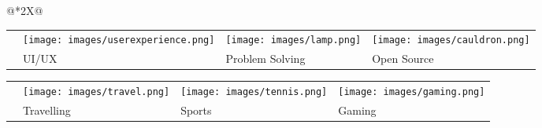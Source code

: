 \documentclass{resume}
\begin{document}
\begin{center}
\begin{tabularx}{\linewidth}{@{}*{2}{X}@{}}
{{        \vspace{0.32cm}
        \begin{tabularx}{\linewidth}{@{}*{4}{>{\centering\arraybackslash}X}@{}}
            {\centering
            \texttt{[image: images/keyboard.png]}
            } &
            {\centering
            \texttt{[image: images/userexperience.png]}
            } &
            {\centering
            \texttt{[image: images/lamp.png]}
            } &
            {\centering
            \texttt{[image: images/cauldron.png]}
            } \\
            {\footnotesize Programming} & {\footnotesize UI/UX} & {\footnotesize Problem Solving} & {\footnotesize Open Source}
        \end{tabularx}
        \begin{tabularx}{\linewidth}{@{}*{4}{>{\centering\arraybackslash}X}@{}}
            {\centering
            \texttt{[image: images/microphone.png]}
            } &
            {\centering
            \texttt{[image: images/travel.png]}
            } &
            {\centering
            \texttt{[image: images/tennis.png]}
            } &
            {\centering
            \texttt{[image: images/gaming.png]}
            } \\
            {\footnotesize Singing} & {\footnotesize Travelling} & {\footnotesize Sports} & {\footnotesize Gaming}
        \end{tabularx}
    }
}
\end{tabularx}
\end{center}
\end{document}
